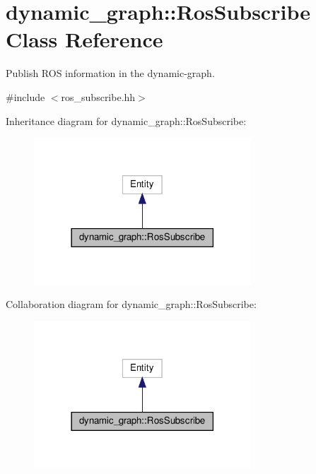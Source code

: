 \hypertarget{classdynamic__graph_1_1RosSubscribe}{}\section{dynamic\+\_\+graph\+:\+:Ros\+Subscribe Class Reference}
\label{classdynamic__graph_1_1RosSubscribe}


Publish R\+OS information in the dynamic-\/graph.  




{\ttfamily \#include $<$ros\+\_\+subscribe.\+hh$>$}



Inheritance diagram for dynamic\+\_\+graph\+:\+:Ros\+Subscribe\+:
\nopagebreak
\begin{figure}[H]
\begin{center}
\leavevmode
\includegraphics[width=230pt]{classdynamic__graph_1_1RosSubscribe__inherit__graph}
\end{center}
\end{figure}


Collaboration diagram for dynamic\+\_\+graph\+:\+:Ros\+Subscribe\+:
\nopagebreak
\begin{figure}[H]
\begin{center}
\leavevmode
\includegraphics[width=230pt]{classdynamic__graph_1_1RosSubscribe__coll__graph}
\end{center}
\end{figure}
